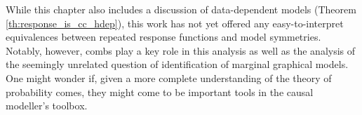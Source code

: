 While this chapter also includes a discussion of data-dependent models (Theorem \ref{th:response_is_cc_hdep}), this work has not yet offered any easy-to-interpret equivalences between repeated response functions and model symmetries. Notably, however, combs play a key role in this analysis as well as the analysis of the seemingly unrelated question of identification of marginal graphical models. One might wonder if, given a more complete understanding of the theory of probability comes, they might come to be important tools in the causal modeller's toolbox.








